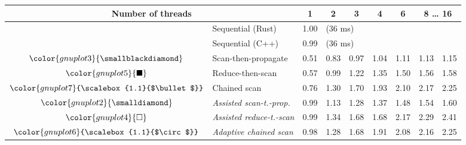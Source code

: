 \begin{tabular}{clrrrrrrr}
\toprule
\multicolumn{2}{c}{\textbf{Number of threads}} & \multicolumn{1}{c}{\textbf{ 1 }} & \multicolumn{1}{c}{\textbf{ 2 }} & \multicolumn{1}{c}{\textbf{ 3 }} & \multicolumn{1}{c}{\textbf{ 4 }} & \multicolumn{1}{c}{\textbf{ 6 }} & \multicolumn{2}{c}{\textbf{ 8 } \dots \textbf{ 16 }} \\
\midrule
& Sequential (Rust) & \multicolumn{1}{r}{ 1.00 } & \multicolumn{ 6 }{l}{(36 ms)} \\
& Sequential (C++) & \multicolumn{1}{r}{ 0.99 } & \multicolumn{ 6 }{l}{(36 ms)} \\
\rowcolor{gnuplot3!10}$\color{gnuplot3}{\smallblackdiamond}$ & Scan-then-propagate & \cellcolor{gnuplot3!10} 0.51 & \cellcolor{gnuplot3!10} 0.83 & \cellcolor{gnuplot3!10} 0.97 & \cellcolor{gnuplot3!10} 1.04 & \cellcolor{gnuplot3!10} 1.11 & \cellcolor{gnuplot3!10} 1.13 & \cellcolor{gnuplot3!10} 1.15 \\
\rowcolor{gnuplot5!10}$\color{gnuplot5}{\blacksquare}$ & Reduce-then-scan & \cellcolor{gnuplot5!10} 0.57 & \cellcolor{gnuplot5!10} 0.99 & \cellcolor{gnuplot5!10} 1.22 & \cellcolor{gnuplot5!10} 1.35 & \cellcolor{gnuplot5!10} 1.50 & \cellcolor{gnuplot5!10} 1.56 & \cellcolor{gnuplot5!10} 1.58 \\
\rowcolor{gnuplot7!10}$\color{gnuplot7}{\scalebox{1.1}{$\bullet$}}$ & Chained scan & \cellcolor{gnuplot7!10} 0.76 & \cellcolor{gnuplot7!10} 1.30 & \cellcolor{gnuplot7!10} 1.70 & \cellcolor{gnuplot7!10} 1.93 & \cellcolor{gnuplot7!10} 2.10 & \cellcolor{gnuplot7!10} 2.17 & \cellcolor{gnuplot7!10} 2.25 \\
\rowcolor{gnuplot2!30}$\color{gnuplot2}{\smalldiamond}$ & \textit{Assisted scan-t.-prop.} & \cellcolor{gnuplot2!30} 0.99 & \cellcolor{gnuplot2!30} 1.13 & \cellcolor{gnuplot2!30} 1.28 & \cellcolor{gnuplot2!30} 1.37 & \cellcolor{gnuplot2!30} 1.48 & \cellcolor{gnuplot2!30} 1.54 & \cellcolor{gnuplot2!30} 1.60 \\
\rowcolor{gnuplot4!30}$\color{gnuplot4}{\square}$ & \textit{Assisted reduce-t.-scan} & \cellcolor{gnuplot4!30} 0.99 & \cellcolor{gnuplot4!30} 1.34 & \cellcolor{gnuplot4!30} 1.68 & \cellcolor{gnuplot4!30} 1.68 & \cellcolor{gnuplot4!30} 2.17 & \cellcolor{gnuplot4!30} 2.29 & \cellcolor{gnuplot4!30} 2.41 \\
\rowcolor{gnuplot6!30}$\color{gnuplot6}{\scalebox{1.1}{$\circ$}}$ & \textit{Adaptive chained scan} & \cellcolor{gnuplot6!30} 0.98 & \cellcolor{gnuplot6!30} 1.28 & \cellcolor{gnuplot6!30} 1.68 & \cellcolor{gnuplot6!30} 1.91 & \cellcolor{gnuplot6!30} 2.08 & \cellcolor{gnuplot6!30} 2.16 & \cellcolor{gnuplot6!30} 2.25 \\

\end{tabular}
